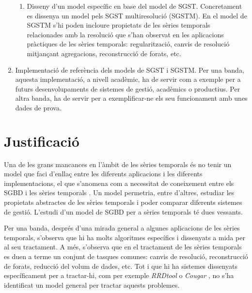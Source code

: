 \begin{enumerate}
\begin{enumerate}
  \item Disseny d'un model específic en base del model de
    SGST. Concretament es dissenya un model pels SGST multiresolució
    (SGSTM).  En el model de SGSTM s'hi poden incloure propietats de
    les sèries temporals relacionades amb la resolució que s'han
    observat en les aplicacions pràctiques de les sèries temporals:
    regularització, canvis de resolució mitjançant agregacions,
    reconstrucció de forats, etc.
  \end{enumerate}

\item Implementació de referència dels models de SGST i SGSTM. Per una
  banda, aquesta implementació, a nivell acadèmic, ha de servir com a
  exemple per a futurs desenvolupaments de sistemes de gestió,
  acadèmics o productius. Per altra banda, ha de servir per a
  exemplificar-ne els seu funcionament amb unes dades de prova.



\end{enumerate}






\section{Justificació}

Una de les grans mancances en l'àmbit de les sèries temporals és no
tenir un model que faci d'enllaç entre les diferents aplicacions i les
diferents implementacions, el que s'anomena com a necessitat de
coneixement entre els SGBD i les sèries
temporals \parencite{zhang11,stonebraker09:scidb}. Un model permetria,
entre d'altres, estudiar les propietats abstractes de les sèries
temporals i poder comparar diferents sistemes de gestió.
L'estudi d'un model de SGBD per a sèries temporals té dues vessants.


Per una banda, després d'una mirada general a algunes aplicacions de
les sèries temporals, s'observa que hi ha molts algoritmes específics
i dissenyats a mida per al seu tractament. A més, s'observa que en el
tractament de les sèries temporals es duen a terme un conjunt de
tasques comunes: canvis de resolució, reconstrucció de forats,
reducció del volum de dades, etc.  Tot i que hi ha sistemes dissenyats
específicament per a tractar-hi, com per exemple
\emph{RRDtool} \parencite{rrdtool} o \emph{Cougar} \parencite{fung02},
no s'ha identificat un model general per tractar aquests problemes.

